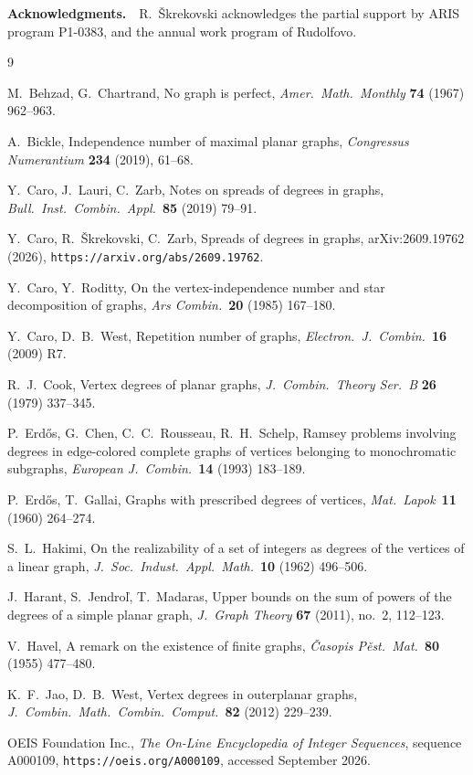 \documentclass[10pt,a4paper]{article}
\begin{document}
\bigskip\noindent\textbf{Acknowledgments.}~~R.~\v{S}krekovski acknowledges the partial support by ARIS program P1-0383, and the annual work program of Rudolfovo.

\begin{thebibliography}{9}

M.~Behzad, G.~Chartrand, No graph is perfect, \emph{Amer.\ Math.\
Monthly} \textbf{74} (1967) 962--963.


A.~Bickle, Independence number of maximal planar graphs,
\emph{Congressus Numerantium} \textbf{234} (2019), 61--68.

Y.~Caro, J.~Lauri, C.~Zarb, Notes on spreads of degrees in graphs,
\emph{Bull.\ Inst.\ Combin.\ Appl.}\ \textbf{85} (2019) 79--91.

Y.~Caro, R.~\v{S}krekovski, C.~Zarb, Spreads of degrees in graphs, arXiv:2609.19762
(2026), \texttt{https://arxiv.org/abs/2609.19762}.



Y.~Caro, Y.~Roditty, On the vertex-independence number and star decomposition of
graphs, \emph{Ars Combin.}\ \textbf{20} (1985) 167--180.

Y.~Caro, D.~B.~West, Repetition number of graphs, \emph{Electron.\ J.\
Combin.}\ \textbf{16} (2009) R7.

R.~J.~Cook, Vertex degrees of planar graphs, \emph{J.\ Combin.\ Theory Ser.\ B}
\textbf{26} (1979) 337--345.


P.~Erd\H{o}s, G.~Chen, C.~C.~Rousseau, R.~H.~Schelp, Ramsey problems involving
degrees in edge-colored complete graphs of vertices belonging to monochromatic subgraphs,
\emph{European J.\ Combin.}\ \textbf{14} (1993) 183--189.

P.~Erd\H{o}s, T.~Gallai, Graphs with prescribed degrees of vertices,
\emph{Mat.\ Lapok}\ \textbf{11} (1960) 264--274.

S.~L.~Hakimi, On the realizability of a set of integers as degrees of the
vertices of a linear graph, \emph{J.\ Soc.\ Indust.\ Appl.\ Math.}\ \textbf{10} (1962) 496--506.

\bibitem {HarantJendrolMadaras}J.~Harant, S.~Jendro\v{l}, T.~Madaras, Upper bounds on the sum of powers
of the degrees of a simple planar graph, \emph{J.\ Graph Theory} \textbf{67} (2011), no.~2, 112--123.

\bibitem {Havel}V.~Havel, A remark on the existence of finite graphs, \emph{\v{C}asopis P\v{e}st.\
Mat.}\ \textbf{80} (1955) 477--480.

\bibitem {JaoWest}K.~F.~Jao, D.~B.~West, Vertex degrees in outerplanar graphs, \emph{J.\ Combin.\
Math.\ Combin.\ Comput.}\ \textbf{82} (2012) 229--239.

OEIS Foundation Inc., \emph{The On-Line Encyclopedia of Integer Sequences},
sequence A000109, \texttt{https://oeis.org/A000109}, accessed September 2026.

\end{thebibliography}
\end{document}
